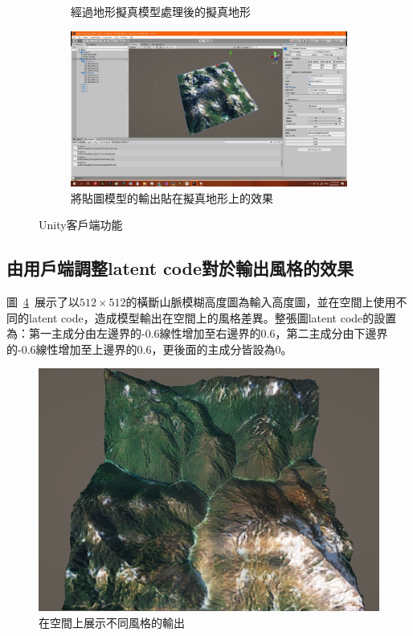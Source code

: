 \documentclass[a4paper, 12pt]{article}
\begin{document}
\begin{figure}
\begin{subfigure}[b]{0.475\textwidth}
        \caption[]%
        {{\small 經過地形擬真模型處理後的擬真地形}}
        \label{fig:16}
    \end{subfigure}
    \hfill
    \begin{subfigure}[b]{0.475\textwidth}
        \centering
        \includegraphics[width=\textwidth]{fig/17.jpg}
        \caption[]%
        {{\small 將貼圖模型的輸出貼在擬真地形上的效果}}
        \label{fig:17}
    \end{subfigure}
    \caption[ The average and standard deviation of critical parameters ]
    {\small Unity客戶端功能}
    \label{fig:unity}
\end{figure}

\subsection{由用戶端調整latent code對於輸出風格的效果}
圖~\ref{fig:18}~展示了以$512 \times 512$的橫斷山脈模糊高度圖為輸入高度圖，並在空間上使用不同的latent code，造成模型輸出在空間上的風格差異。整張圖latent code的設置為：第一主成分由左邊界的-0.6線性增加至右邊界的0.6，第二主成分由下邊界的-0.6線性增加至上邊界的0.6，更後面的主成分皆設為0。

\begin{figure}[htbp]
    \centering
    \includegraphics[width=0.7\linewidth]{fig/18.jpg}
    \caption{在空間上展示不同風格的輸出}
    \label{fig:18}
\end{figure}
\end{document}
